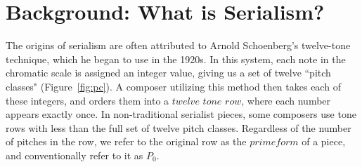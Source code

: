 \section{Background: What is Serialism?}

The origins of serialism are often attributed to Arnold Schoenberg's twelve-tone technique, which
he began to use in the 1920s. In this system, each note in the chromatic scale 
is assigned an integer value, giving us a set of twelve ``pitch classes" (Figure~\ref{fig:pc}).
A composer utilizing this method then takes each of these integers, and orders 
them into a $twelve$ $tone$ $row$, where each number appears exactly once. In non-traditional
serialist pieces, some composers use tone rows with less than the full set of twelve pitch classes.
Regardless of the number of pitches in the row, we refer to the original row as the $prime form$ 
of a piece, and conventionally refer to it as $P_0$. 

